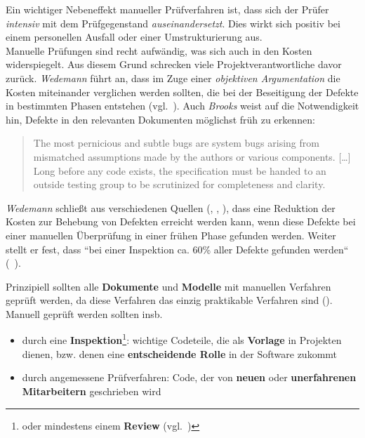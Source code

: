 \noindent
Ein wichtiger Nebeneffekt manueller Prüfverfahren ist, dass sich der Prüfer \textit{intensiv} mit dem Prüfgegenstand \textit{auseinandersetzt}.
Dies wirkt sich positiv bei einem personellen Ausfall oder einer Umstrukturierung aus.\\

\noindent
Manuelle Prüfungen sind recht aufwändig, was sich auch in den Kosten widerspiegelt.
Aus diesem Grund schrecken viele Projektverantwortliche davor zurück. \textit{Wedemann} führt an, dass im Zuge einer \textit{objektiven Argumentation} die Kosten miteinander verglichen werden sollten, die bei der Beseitigung der Defekte in bestimmten Phasen entstehen (vgl.~\cite[16]{Wed09c}).
Auch \textit{Brooks} weist auf die Notwendigkeit hin, Defekte in den relevanten Dokumenten möglichst früh zu erkennen:

\blockquote[{\cite[142]{Bro95}}]{
The most pernicious and subtle bugs are system bugs arising from mismatched assumptions made by the authors or various components. [\ldots] Long before any code exists, the specification must be handed to an outside testing group to be scrutinized for completeness and clarity.
}

\noindent
\textit{Wedemann} schließt aus verschiedenen Quellen (\cite{Rad01}, \cite{Wie02}, \cite{GG93}), dass eine Reduktion der Kosten zur Behebung von Defekten erreicht werden kann, wenn diese Defekte bei einer manuellen Überprüfung in einer frühen Phase gefunden werden.
Weiter stellt er fest,  dass ``bei einer Inspektion ca. 60{\%} aller Defekte gefunden werden`` (~\cite[16]{Wed09c}).\\

\begin{tcolorbox}
Prinzipiell sollten alle  \textbf{Dokumente} und \textbf{Modelle} mit manuellen Verfahren geprüft werden, da diese Verfahren das einzig praktikable Verfahren sind (\cite[16]{Wed09c}).\\
Manuell geprüft werden sollten insb.

\begin{itemize}
    \item durch eine \textbf{Inspektion}\footnote{
    oder mindestens einem \textbf{Review} (vgl.~\cite[Aufgabe 3.8, 83]{Wed09c})
    }: wichtige Codeteile, die als \textbf{Vorlage} in Projekten dienen, bzw. denen eine \textbf{entscheidende Rolle} in der Software zukommt
    \item durch angemessene Prüfverfahren: Code, der von \textbf{neuen} oder \textbf{unerfahrenen Mitarbeitern} geschrieben wird
\end{itemize}
\end{tcolorbox}
\vspace{2mm}

